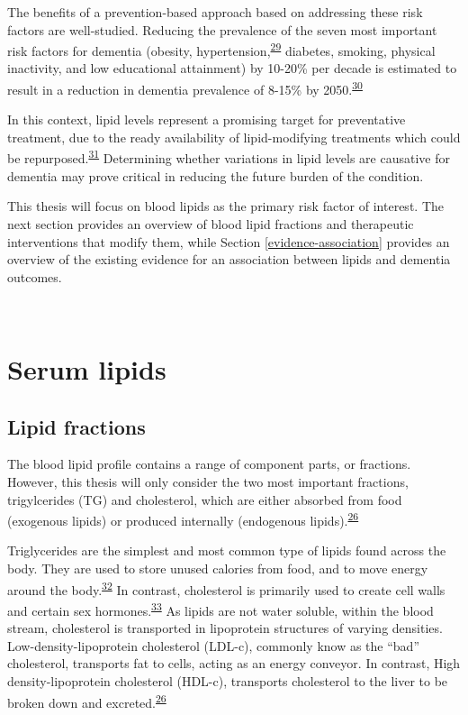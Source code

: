 \documentclass[a4paper, twoside]{templates/ociamthesis}
\begin{document}
The benefits of a prevention-based approach based on addressing these risk factors are well-studied. Reducing the prevalence of the seven most important risk factors for dementia (obesity, hypertension,\textsuperscript{\protect\hyperlink{ref-hughes2020}{29}} diabetes, smoking, physical inactivity, and low educational attainment) by 10-20\% per decade is estimated to result in a reduction in dementia prevalence of 8-15\% by 2050.\textsuperscript{\protect\hyperlink{ref-norton2014potential}{30}}

In this context, lipid levels represent a promising target for preventative treatment, due to the ready availability of lipid-modifying treatments which could be repurposed.\textsuperscript{\protect\hyperlink{ref-pushpakom2019}{31}} Determining whether variations in lipid levels are causative for dementia may prove critical in reducing the future burden of the condition.

This thesis will focus on blood lipids as the primary risk factor of interest. The next section provides an overview of blood lipid fractions and therapeutic interventions that modify them, while Section \ref{evidence-association} provides an overview of the existing evidence for an association between lipids and dementia outcomes.

~

\hypertarget{serum-lipids}{%
\section{Serum lipids}\label{serum-lipids}}

\hypertarget{intro-lipid-fractions}{%
\subsection{Lipid fractions}\label{intro-lipid-fractions}}

The blood lipid profile contains a range of component parts, or fractions. However, this thesis will only consider the two most important fractions, trigylcerides (TG) and cholesterol, which are either absorbed from food (exogenous lipids) or produced internally (endogenous lipids).\textsuperscript{\protect\hyperlink{ref-feingold2000}{26}}

Triglycerides are the simplest and most common type of lipids found across the body. They are used to store unused calories from food, and to move energy around the body.\textsuperscript{\protect\hyperlink{ref-laufs2020}{32}} In contrast, cholesterol is primarily used to create cell walls and certain sex hormones.\textsuperscript{\protect\hyperlink{ref-zampelas2019}{33}} As lipids are not water soluble, within the blood stream, cholesterol is transported in lipoprotein structures of varying densities. Low-density-lipoprotein cholesterol (LDL-c), commonly know as the ``bad'' cholesterol, transports fat to cells, acting as an energy conveyor. In contrast, High density-lipoprotein cholesterol (HDL-c), transports cholesterol to the liver to be broken down and excreted.\textsuperscript{\protect\hyperlink{ref-feingold2000}{26}}
\end{document}
